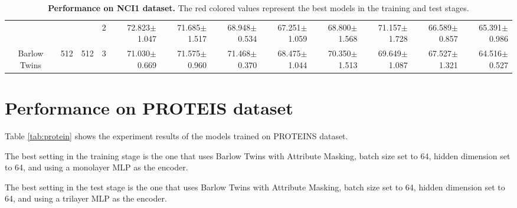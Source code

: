 \begin{table}[htpb]
{\begin{tabular}{c|c|c|c|rr|rr|rr|rr}
                                 &                                                                                 &                                                                                        & 2                                                                                         & 72.823$\pm$1.047                        & 71.685$\pm$1.517                        & 68.948$\pm$0.534                        & 67.251$\pm$1.059                        & 68.800$\pm$1.568                        & 71.157$\pm$1.728                        & 66.589$\pm$0.857                        & 65.391$\pm$0.986                       \\
\multirow{-12}{*}{Barlow Twins}  & \multirow{-6}{*}{512}                                                           & \multirow{-3}{*}{512}                                                                  & 3                                                                                         & 71.030$\pm$0.669                        & 71.575$\pm$0.960                        & 71.468$\pm$0.370                        & 68.475$\pm$1.044                        & 70.350$\pm$1.513                        & 69.649$\pm$1.087                        & 67.527$\pm$1.321                        & 64.516$\pm$0.527                       \\ \hline
\end{tabular}
}
    \caption[Performance on NCI1 dataset]{ \textbf{Performance on NCI1 dataset.} The red colored values represent the best models in the training and test stages.}
    \label{tab:nci1}
\end{table}


\section{Performance on PROTEIS dataset}

Table \ref{tab:protein} shows the experiment results of the models trained on PROTEINS dataset. 


The best setting in the training stage is the one that uses Barlow Twins with Attribute Masking, batch size set to 64, hidden dimension set to 64, and using a monolayer MLP as the encoder.

The best setting in the test stage is the one that uses Barlow Twins with Attribute Masking, batch size set to 64, hidden dimension set to 64, and using a trilayer MLP as the encoder.


